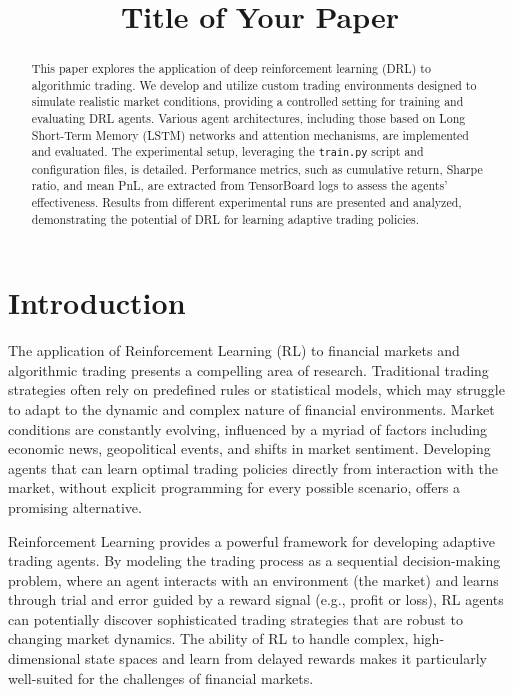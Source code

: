 \documentclass{IEEEtran}
\title{Title of Your Paper}
\author{\IEEEauthorblockN{Author Name}
\IEEEauthorblockA{Affiliation\\
City, Country\\
Email: author.email@example.com}}
\begin{document}
\maketitle

\begin{abstract}
This paper explores the application of deep reinforcement learning (DRL) to algorithmic trading. We develop and utilize custom trading environments designed to simulate realistic market conditions, providing a controlled setting for training and evaluating DRL agents. Various agent architectures, including those based on Long Short-Term Memory (LSTM) networks and attention mechanisms, are implemented and evaluated. The experimental setup, leveraging the \texttt{train.py} script and configuration files, is detailed. Performance metrics, such as cumulative return, Sharpe ratio, and mean PnL, are extracted from TensorBoard logs to assess the agents' effectiveness. Results from different experimental runs are presented and analyzed, demonstrating the potential of DRL for learning adaptive trading policies.
\end{abstract}

\section{Introduction}
The application of Reinforcement Learning (RL) to financial markets and algorithmic trading presents a compelling area of research. Traditional trading strategies often rely on predefined rules or statistical models, which may struggle to adapt to the dynamic and complex nature of financial environments. Market conditions are constantly evolving, influenced by a myriad of factors including economic news, geopolitical events, and shifts in market sentiment. Developing agents that can learn optimal trading policies directly from interaction with the market, without explicit programming for every possible scenario, offers a promising alternative.

Reinforcement Learning provides a powerful framework for developing adaptive trading agents. By modeling the trading process as a sequential decision-making problem, where an agent interacts with an environment (the market) and learns through trial and error guided by a reward signal (e.g., profit or loss), RL agents can potentially discover sophisticated trading strategies that are robust to changing market dynamics. The ability of RL to handle complex, high-dimensional state spaces and learn from delayed rewards makes it particularly well-suited for the challenges of financial markets.
\end{document}
